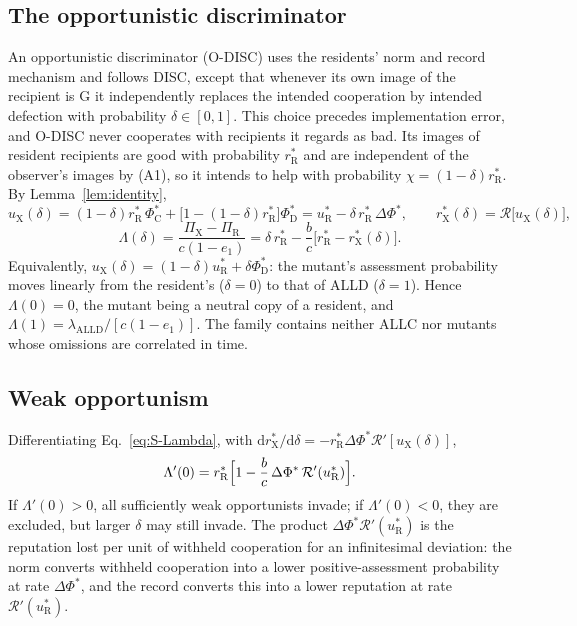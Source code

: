 \documentclass[fleqn,10pt]{article}
\theoremstyle{plain}
\theoremstyle{remark}
\newcommand{\Rm}{\mathcal R}
\newcommand{\G}{\mathrm G}
\newcommand{\C}{\mathrm C}
\newcommand{\D}{\mathrm D}
\newcommand{\ALLD}{\mathrm{ALLD}}
\newcommand{\rR}{r^*_{\mathrm R}}
\newcommand{\uR}{u^*_{\mathrm R}}
\begin{document}
\subsection{The opportunistic discriminator}
An opportunistic discriminator (O-DISC) uses the residents' norm and record
mechanism and follows DISC, except that whenever its own image of the
recipient is $\G$ it independently replaces the intended cooperation by
intended defection with probability $\delta\in[0,1]$. This choice precedes
implementation error, and O-DISC never cooperates with recipients it regards as
bad. Its images of resident recipients are good with probability $\rR$ and are
independent of the observer's images by (A1), so it intends to help with
probability $\chi=(1-\delta)\rR$. By Lemma~\ref{lem:identity},
\begin{equation}
u_{\mathrm X}(\delta)=(1-\delta)\rR\,\Phi^*_\C+\bigl[1-(1-\delta)\rR\bigr]\Phi^*_\D
=\uR-\delta\,\rR\,\Delta\Phi^*,
\qquad
r^*_{\mathrm X}(\delta)=\Rm\bigl[u_{\mathrm X}(\delta)\bigr],
\label{eq:S-odisc-u}
\end{equation}
\begin{equation}
\Lambda(\delta)=\frac{\Pi_{\mathrm X}-\Pi_{\mathrm R}}{c(1-e_1)}
=\delta\,\rR-\frac bc\bigl[\rR-r^*_{\mathrm X}(\delta)\bigr].
\label{eq:S-Lambda}
\end{equation}
Equivalently, $u_{\mathrm X}(\delta)=(1-\delta)\uR+\delta\Phi^*_\D$: the mutant's
assessment probability moves linearly from the resident's ($\delta=0$) to that
of ALLD ($\delta=1$). Hence $\Lambda(0)=0$, the mutant being a neutral copy of
a resident, and $\Lambda(1)=\lambda_{\ALLD}/[c(1-e_1)]$. The family contains
neither ALLC nor mutants whose omissions are correlated in time.

\subsection{Weak opportunism}
Differentiating Eq.~\eqref{eq:S-Lambda}, with
$\mathrm dr^*_{\mathrm X}/\mathrm d\delta=-\rR\Delta\Phi^*\Rm'[u_{\mathrm X}(\delta)]$,
\begin{equation}
\Lambda'(0)=\rR\Bigl[1-\frac bc\,\Delta\Phi^*\,\Rm'(\uR)\Bigr].
\label{eq:S-slope}
\end{equation}
If $\Lambda'(0)>0$, all sufficiently weak opportunists invade; if
$\Lambda'(0)<0$, they are excluded, but larger $\delta$ may still invade. The
product $\Delta\Phi^*\Rm'(\uR)$ is the reputation lost per unit of withheld
cooperation for an infinitesimal deviation: the norm converts withheld
cooperation into a lower positive-assessment probability at rate
$\Delta\Phi^*$, and the record converts this into a lower reputation at rate
$\Rm'(\uR)$.
\end{document}
